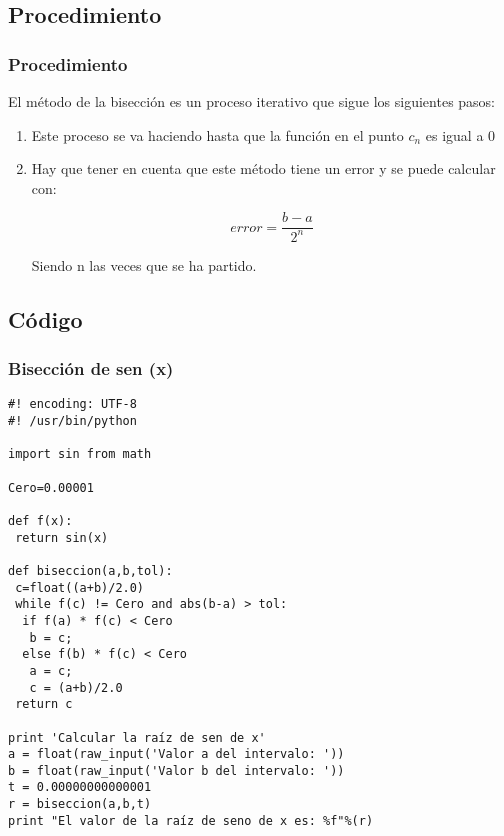 \documentclass{beamer}
\begin{document}
\subsection{Procedimiento}
\begin{frame}
\frametitle{Procedimiento}
El método de la bisección es un proceso iterativo que sigue los siguientes pasos:
\begin{enumerate}
 \item
  Este proceso se va haciendo hasta que la función en el punto $c_n$ es igual a $0$
 \pause
 \item
  Hay que tener en cuenta que este método tiene un error y se puede calcular con:
  \begin{center}
   $$ error=\frac{b-a}{2^n} $$ 
  \end{center} 
  Siendo n las veces que se ha partido.
 \pause
 
\end{enumerate}
\end{frame}

\subsection{Código} 
\begin{frame}[fragile]

\frametitle{Bisección de sen (x)}
\small
\begin{verbatim}
#! encoding: UTF-8 
#! /usr/bin/python 

import sin from math

Cero=0.00001

def f(x):
 return sin(x)

def biseccion(a,b,tol):
 c=float((a+b)/2.0)
 while f(c) != Cero and abs(b-a) > tol:
  if f(a) * f(c) < Cero
   b = c;
  else f(b) * f(c) < Cero
   a = c;
   c = (a+b)/2.0
 return c

print 'Calcular la raíz de sen de x'
a = float(raw_input('Valor a del intervalo: '))
b = float(raw_input('Valor b del intervalo: '))
t = 0.00000000000001
r = biseccion(a,b,t)
print "El valor de la raíz de seno de x es: %f"%(r)
\end{verbatim}

\end{frame}
\end{document}
